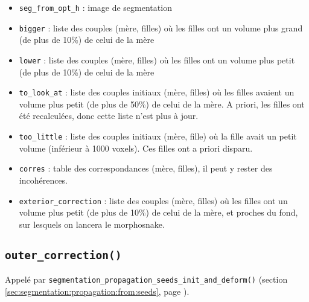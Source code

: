 \documentclass{article}
\def \mycolor {red}
\begin{document}
\begin{itemize}
\itemsep -1ex
\item \verb|seg_from_opt_h| : image de segmentation
\item \verb|bigger| : liste des couples (m\`ere, filles) o\`u les filles ont un volume plus grand (de plus de 10\%) de celui de la m\`ere
\item \verb|lower| : liste des couples (m\`ere, filles) o\`u les filles ont un volume plus petit (de plus de 10\%) de celui de la m\`ere
\item \verb|to_look_at| : liste des couples initiaux (m\`ere, filles) o\`u les filles avaient un volume plus petit (de plus de 50\%) de celui de la m\`ere. A priori, les filles ont \'et\'e recalcul\'ees, donc cette liste n'est plus \`a jour.
\item \verb|too_little| : liste des couples initiaux (m\`ere, fille) o\`u la fille avait un petit volume (inf\'erieur \`a 1000 voxels). Ces filles ont a priori disparu.
\item \verb|corres| : table des correspondances (m\`ere, filles), il peut y rester des incoh\'erences.
\item \verb|exterior_correction| : liste des couples (m\`ere, filles) o\`u les filles ont un volume plus petit (de plus de 10\%) de celui de la m\`ere, et proches du fond, sur lesquels on lancera le morphosnake.
\end{itemize}
\color{black}




\subsection{\texttt{outer\_correction()}}
\label{sec:outer:correction}

\color{\mycolor}
Appel\'e par \texttt{segmentation\_propagation\_seeds\_init\_and\_deform()} (section \ref{sec:segmentation:propagation:from:seeds}, page \pageref{sec:segmentation:propagation:from:seeds}).
\color{black}
\end{document}
